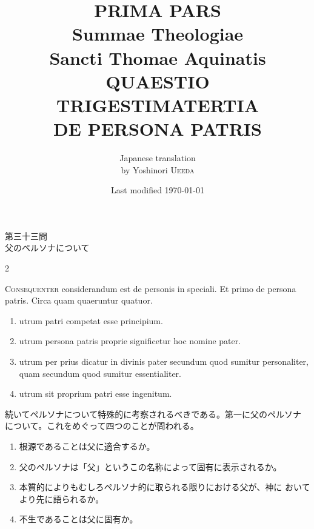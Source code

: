 \documentclass[paper=a4paper,fontsize=10pt,jafontsize=9pt,titlepage]{jlreq}
\title{{\bfseries PRIMA PARS}\\{\Huge Summae Theologiae}\\Sancti Thomae
Aquinatis\\{\sffamily QUAESTIO TRIGESTIMATERTIA}\\DE PERSONA PATRIS}
\author{Japanese translation\\by Yoshinori {\scshape Ueeda}}
\date{Last modified \today}
\begin{document}
\maketitle
\thispagestyle{empty}
\begin{center}
{\Large 第三十三問\\父のペルソナについて}
\end{center}


\begin{paracol}{2}

{\Huge C}{\scshape onsequenter} considerandum est de
 personis in speciali. Et primo de persona patris. Circa quam
 quaeruntur quatuor. 

\begin{enumerate}
 \item utrum patri competat esse principium.
 \item utrum persona patris proprie significetur hoc nomine pater.
 \item utrum per prius dicatur in divinis pater secundum quod sumitur personaliter, quam secundum quod sumitur essentialiter.
 \item utrum sit proprium patri esse ingenitum.
\end{enumerate}


\switchcolumn


続いてペルソナについて特殊的に考察されるべきである。第一に父のペルソナ
 について。これをめぐって四つのことが問われる。


\begin{enumerate}
 \item 根源であることは父に適合するか。
 \item 父のペルソナは「父」というこの名称によって固有に表示されるか。
 \item 本質的によりもむしろペルソナ的に取られる限りにおける父が、神に
       おいてより先に語られるか。
 \item 不生であることは父に固有か。
\end{enumerate}


\switchcolumn*



\end{paracol}



\newpage



{}
\setcounter{section}{33}
\setcounter{subsection}{0}
\end{document}
